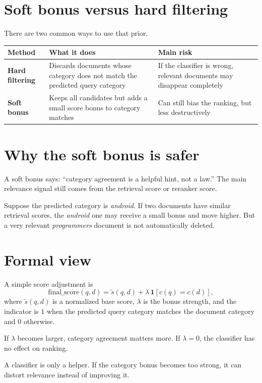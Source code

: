 \documentclass[11pt,oneside]{report}
\begin{document}
\section*{Soft bonus versus hard filtering}
There are two common ways to use that prior.
\begin{center}
\begin{tabularx}{\textwidth}{>{\bfseries}lYY}
\toprule
Method & What it does & Main risk \\
\midrule
Hard filtering & Discards documents whose category does not match the predicted query category & If the classifier is wrong, relevant documents may disappear completely \\
Soft bonus & Keeps all candidates but adds a small score bonus to category matches & Can still bias the ranking, but less destructively \\
\bottomrule
\end{tabularx}
\end{center}

\section*{Why the soft bonus is safer}
A soft bonus says: ``category agreement is a helpful hint, not a law.'' The main relevance signal still comes from the retrieval score or reranker score.

\begin{examplebox}
Suppose the predicted category is \emph{android}. If two documents have similar retrieval scores, the \emph{android} one may receive a small bonus and move higher. But a very relevant \emph{programmers} document is not automatically deleted.
\end{examplebox}

\section*{Formal view}
A simple score adjustment is
\[
\mathrm{final\_score}(q,d)=\tilde{s}(q,d)+\lambda\,\mathbf{1}[\hat{c}(q)=c(d)],
\]
where $\tilde{s}(q,d)$ is a normalized base score, $\lambda$ is the bonus strength, and the indicator is $1$ when the predicted query category matches the document category and $0$ otherwise.

If $\lambda$ becomes larger, category agreement matters more. If $\lambda=0$, the classifier has no effect on ranking.

\begin{warningbox}
A classifier is only a helper. If the category bonus becomes too strong, it can distort relevance instead of improving it.
\end{warningbox}
\end{document}
